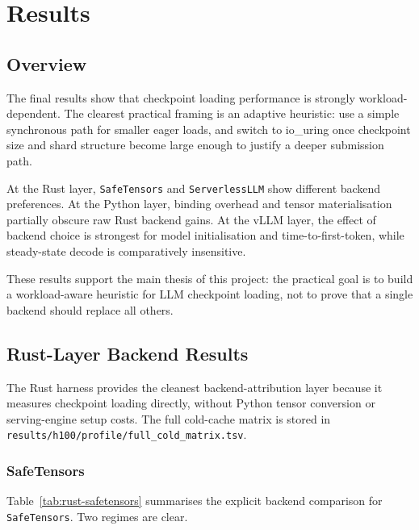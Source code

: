 \chapter{Results}
\label{chap:results}

\section{Overview}

The final results show that checkpoint loading performance is strongly workload-dependent. The clearest practical framing is an adaptive heuristic: use a simple synchronous path for smaller eager loads, and switch to io\_uring once checkpoint size and shard structure become large enough to justify a deeper submission path.

At the Rust layer, \texttt{SafeTensors} and \texttt{ServerlessLLM} show different backend preferences. At the Python layer, binding overhead and tensor materialisation partially obscure raw Rust backend gains. At the vLLM layer, the effect of backend choice is strongest for model initialisation and time-to-first-token, while steady-state decode is comparatively insensitive.

These results support the main thesis of this project: the practical goal is to build a workload-aware heuristic for LLM checkpoint loading, not to prove that a single backend should replace all others.

\section{Rust-Layer Backend Results}

The Rust harness provides the cleanest backend-attribution layer because it measures checkpoint loading directly, without Python tensor conversion or serving-engine setup costs. The full cold-cache matrix is stored in \texttt{results/h100/profile/full\_cold\_matrix.tsv}.

\subsection{SafeTensors}

Table~\ref{tab:rust-safetensors} summarises the explicit backend comparison for \texttt{SafeTensors}. Two regimes are clear.

